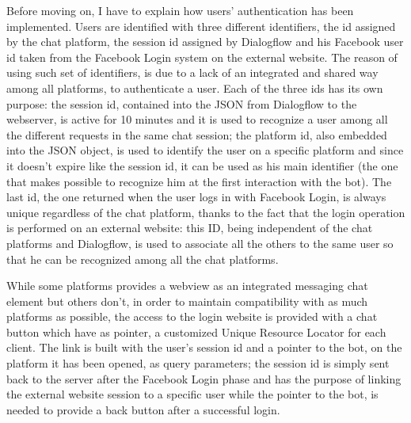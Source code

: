 \documentclass[b5paper,10pt,twoside,cucitura]{toptesi}
\begin{document}
Before moving on, I have to explain how users' authentication has been implemented. Users are identified with three different identifiers, the id assigned by the chat platform, the session id assigned by Dialogflow and his Facebook user id taken from the Facebook Login system on the external website. The reason of using such set of identifiers, is due to a lack of an integrated and shared way among all platforms, to authenticate a user. Each of the three ids has its own purpose: the session id, contained into the JSON from Dialogflow to the webserver, is active for 10 minutes and it is used to recognize a user among all the different requests in the same chat session; the platform id, also embedded into the JSON object, is used to identify the user on a specific platform and since it doesn't expire like the session id, it can be used as his main identifier (the one that makes possible to recognize him at the first interaction with the bot). The last id, the one returned when the user logs in with Facebook Login, is always unique regardless of the chat platform, thanks to the fact that the login operation is performed on an external website: this ID, being independent of the chat platforms and Dialogflow, is used to associate all the others to the same user so that he can be recognized among all the chat platforms.
\\
\noindent

While some platforms provides a webview as an integrated messaging chat element but others don't, in order to maintain compatibility with as much platforms as possible, the access to the login website is provided with a chat button which have as pointer, a customized Unique Resource Locator for each client. The link is built with the user's session id and a pointer to the bot, on the platform it has been opened, as query parameters; the session id is simply sent back to the server after the Facebook Login phase and has the purpose of linking the external website session to a specific user while the pointer to the bot, is needed to provide a back button after a successful login.
\end{document}
